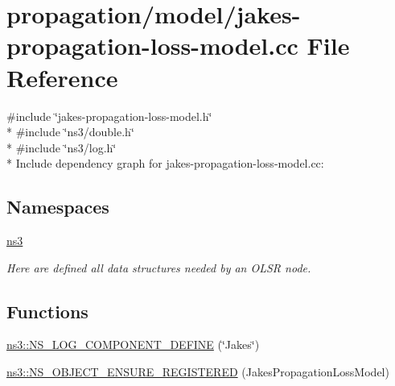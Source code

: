 \hypertarget{jakes-propagation-loss-model_8cc}{}\section{propagation/model/jakes-\/propagation-\/loss-\/model.cc File Reference}
\label{jakes-propagation-loss-model_8cc}
{\ttfamily \#include \char`\"{}jakes-\/propagation-\/loss-\/model.\+h\char`\"{}}\\*
{\ttfamily \#include \char`\"{}ns3/double.\+h\char`\"{}}\\*
{\ttfamily \#include \char`\"{}ns3/log.\+h\char`\"{}}\\*
Include dependency graph for jakes-\/propagation-\/loss-\/model.cc\+:
\subsection*{Namespaces}
\begin{DoxyCompactItemize}
\item 
 \hyperlink{namespacens3}{ns3}
\begin{DoxyCompactList}\small\item\em Here are defined all data structures needed by an O\+L\+SR node. \end{DoxyCompactList}\end{DoxyCompactItemize}
\subsection*{Functions}
\begin{DoxyCompactItemize}
\item 
\hyperlink{namespacens3_adbc0f750a0ac3aef5846fc9d4dce26ca}{ns3\+::\+N\+S\+\_\+\+L\+O\+G\+\_\+\+C\+O\+M\+P\+O\+N\+E\+N\+T\+\_\+\+D\+E\+F\+I\+NE} (\char`\"{}Jakes\char`\"{})
\item 
\hyperlink{namespacens3_a6839ea5eed619527b8a4e70a5237b606}{ns3\+::\+N\+S\+\_\+\+O\+B\+J\+E\+C\+T\+\_\+\+E\+N\+S\+U\+R\+E\+\_\+\+R\+E\+G\+I\+S\+T\+E\+R\+ED} (Jakes\+Propagation\+Loss\+Model)
\end{DoxyCompactItemize}

